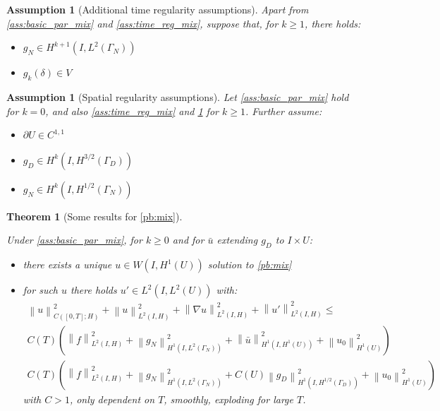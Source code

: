 \documentclass[english,a4paper,9pt,oneside]{scrbook}	%
\theoremstyle{break}
\newtheorem{thm}[equation]{Theorem}
\newtheorem{ass}[equation]{Assumption}
\theoremstyle{remark}
\newcommand{\norm}[1]{\left\lVert#1\right\rVert}
\begin{document}
\begin{appendices}
\begin{ass}[Additional time regularity assumptions]
\label{ass:add_time_reg_mix}
Apart from \cref{ass:basic_par_mix} and \cref{ass:time_reg_mix}, suppose that, for $k\geq 1$, there holds:

\begin{itemize}
	\item $g_N \in H^{k+1}(I, L^2(\Gamma_N))$
	\item $g_k(\delta)  \in V$
\end{itemize} 
\end{ass}


\begin{ass}[Spatial regularity assumptions]
\label{ass:space_reg_mix}
Let \cref{ass:basic_par_mix} hold for $k=0$, and also \cref{ass:time_reg_mix} and \cref{ass:add_time_reg_mix} for $k\geq 1$. Further assume:

\begin{itemize}
	\item $\partial U \in C^{1,1}$
	\item $g_D \in H^k(I,H^{3/2}(\Gamma_D))$
	\item $g_N \in H^k(I,H^{1/2}(\Gamma_N))$
\end{itemize}

\end{ass}


\begin{thm}[Some results for \cref{pb:mix}]
\label{thm:mix_reg}

Under \cref{ass:basic_par_mix}, for $k \geq 0$ and for $\bar{u}$ extending $g_D$ to $I\times U$:

\begin{itemize}
	\item there exists a unique $u \in W(I,H^1(U))$ solution to \cref{pb:mix}
	\item for such $u$ there holds $u' \in L^2(I,L^2(U))$ with:
	\begin{align*}
	\norm{u}_{C([0,T];H)}^2+\norm{u}^2_{L^2(I,H)}+\norm{\nabla u}^2_{L^2(I,H)} + \norm{u'}^2_{L^2(I,H)} \leq \\
	C(T)\left (  \norm{f}_{L^2(I,H)}^2 +  \norm{g_N}^2_{H^1(I,L^2(\Gamma_N))}   + \norm{\bar{u}}^2_{H^1(I,H^1(U))} + \norm{u_0}^2_{H^1(U)}\right )\\
	C(T)\left (  \norm{f}_{L^2(I,H)}^2 +  \norm{g_N}^2_{H^1(I,L^2(\Gamma_N))}   + C(U) \norm{g_D}^2_{H^1(I,H^{1/2}(\Gamma_D))} + \norm{u_0}^2_{H^1(U)}\right )
\end{align*}with $C>1$, only dependent on $T$, smoothly, exploding for large $T$.
\end{itemize}


\end{thm}
\end{appendices}
\end{document}
